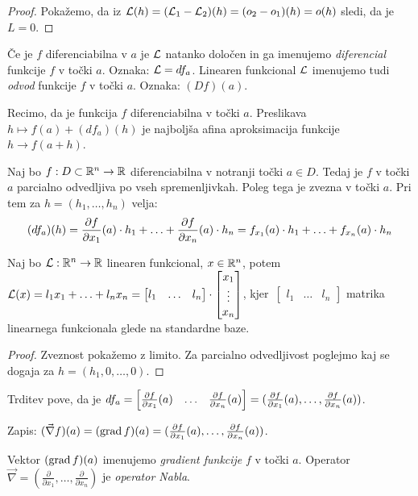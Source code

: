 \begin{proof}
    Pokažemo, da iz $\mathcal{L}(h) = (\mathcal{L}_1 - \mathcal{L}_2)(h) = (o_2 - o_1)(h) = o(h)$ sledi, da je $L = 0$.
\end{proof}

\begin{definicija}
    Če je $f$ diferenciabilna v $a$ je $\mathcal{L}$ natanko določen in ga imenujemo \emph{diferencial} funkcije $f$ v točki $a$. Oznaka: $\mathcal{L} = df_a$. Linearen funkcional $\mathcal{L}$ imenujemo tudi \emph{odvod} funkcije $f$ v točki $a$. Oznaka: $(Df)(a)$.
\end{definicija}

\begin{opomba}
    Recimo, da je funkcija $f$ diferenciabilna v točki $a$. Preslikava $h \mapsto f(a) + (df_a)(h)$ je najboljša afina aproksimacija funkcije $h \to f(a+h)$.
\end{opomba}

\begin{trditev}
    Naj bo $f: D \subset \mathbb{R}^n \to \mathbb{R}$ diferenciabilna v notranji točki $a \in D$. Tedaj je $f$ v točki $a$ parcialno odvedljiva po vseh spremenljivkah. Poleg tega je zvezna v točki $a$. Pri tem za $h = (h_1, \ldots, h_n)$ velja:
    $$(df_a)(h) = \frac{\partial f}{\partial x_1}(a) \cdot h_1 + \ldots + \frac{\partial f}{\partial x_n}(a) \cdot h_n = f_{x_1}(a) \cdot h_1 + \ldots + f_{x_n}(a) \cdot h_n$$
\end{trditev}

\begin{opomba}
    Naj bo $\mathcal{L}: \mathbb{R}^n \to \mathbb{R}$ linearen funkcional, $x \in \mathbb{R}^n$, potem $\mathcal{L}(x) = l_1x_1+\ldots+l_nx_n = \begin{bmatrix}
        l_1 & \ldots & l_n
    \end{bmatrix} \cdot \begin{bmatrix}
        x_1 \\ \vdots \\ x_n
    \end{bmatrix}$, kjer~$\begin{bmatrix}
        l_1 & \ldots & l_n
    \end{bmatrix}$ matrika linearnega funkcionala glede na standardne baze.    
\end{opomba}

\begin{proof}
    Zveznost pokažemo z limito. Za parcialno odvedljivost poglejmo kaj se dogaja za $h = (h_1, 0, \ldots, 0)$.
\end{proof}

\begin{opomba}
    Trditev pove, da je $df_a = \begin{bmatrix}
        \frac{\partial f}{\partial x_1}(a) & \ldots & \frac{\partial f}{\partial x_n}(a) 
    \end{bmatrix} = (\frac{\partial f}{\partial x_1}(a), \ldots, \frac{\partial f}{\partial x_n}(a))$.

    Zapis: $(\vec{\nabla} f) (a) = (\operatorname{grad} f)(a) = (\frac{\partial f}{\partial x_1}(a), \ldots, \frac{\partial f}{\partial x_n}(a))$.

    Vektor $(\operatorname{grad} f)(a)$ imenujemo \emph{gradient funkcije} $f$ v točki $a$. Operator $\vec{\nabla} = (\frac{\partial}{\partial x_1}, \ldots, \frac{\partial}{\partial x_n})$ je \emph{operator Nabla}.
\end{opomba}

